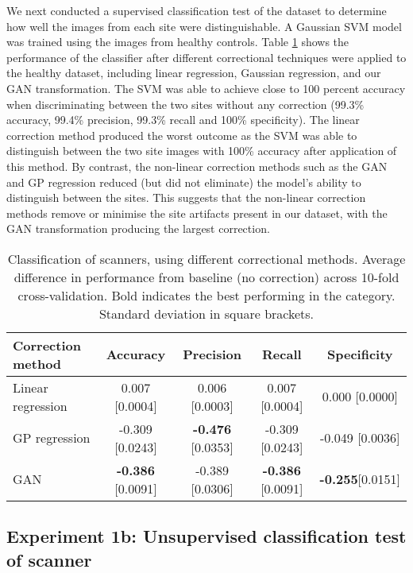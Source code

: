 We next conducted a supervised classification test of the dataset to determine how well the images from each site were distinguishable. A Gaussian SVM model was trained using the images from healthy controls. Table \ref{tab:classify_scanner} shows the performance of the classifier after different correctional techniques were applied to the healthy dataset, including linear regression, Gaussian regression, and our GAN transformation. The SVM was able to achieve close to 100 percent accuracy when discriminating between the two sites without any correction (99.3\% accuracy, 99.4\% precision, 99.3\% recall and 100\% specificity).  The linear correction method produced the worst outcome as the SVM was able to distinguish between the two site images with 100\% accuracy after application of this method. By contrast, the non-linear correction methods such as the GAN and GP regression reduced (but did not eliminate) the model's ability to distinguish between the sites. This suggests that the non-linear correction methods remove or minimise the site artifacts present in our dataset, with the GAN transformation producing the largest correction.

\begin{table}[!ht]
  \centering
  \caption{Classification of scanners, using different correctional methods. Average difference in performance from baseline (no correction) across 10-fold cross-validation. Bold indicates the best performing in the category. Standard deviation in square brackets.}
\begin{tabular}{l|cccc}
    \toprule
    \textbf{Correction method} & \textbf{Accuracy} & \textbf{Precision}& \textbf{Recall} & \textbf{Specificity}\\
    \midrule
    Linear regression   &  0.007 [0.0004] & 0.006 [0.0003] & 0.007 [0.0004] & 0.000 [0.0000]\\
    GP regression    &  -0.309 [0.0243] & \textbf{-0.476} [0.0353] & -0.309 [0.0243] & -0.049 [0.0036]\\
    GAN    & \textbf{-0.386} [0.0091] & -0.389 [0.0306]& \textbf{-0.386} [0.0091] & \textbf{-0.255}[0.0151] \\
    \bottomrule
    \end{tabular}%
  \label{tab:classify_scanner}%
\end{table}

\subsection{Experiment 1b: Unsupervised classification test of scanner} \label{unsupervised_test}

